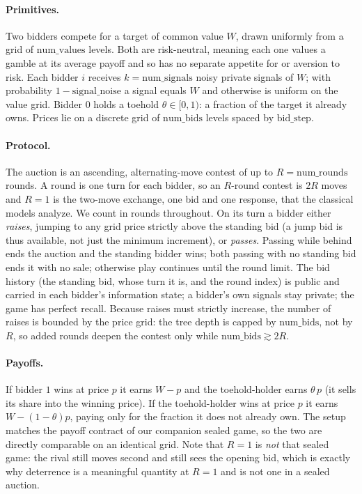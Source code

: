 \documentclass[11pt,a4paper]{article}
\newcommand{\theold}{\theta}   %
\begin{document}
\paragraph{Primitives.} Two bidders compete for a target of common value $W$, drawn uniformly from a grid of $\mathrm{num\_values}$ levels. Both are risk-neutral, meaning each one values a gamble at its average payoff and so has no separate appetite for or aversion to risk. Each bidder $i$ receives $k=\mathrm{num\_signals}$ noisy private signals of $W$; with probability $1-\mathrm{signal\_noise}$ a signal equals $W$ and otherwise is uniform on the value grid. Bidder $0$ holds a toehold $\theold\in[0,1)$: a fraction of the target it already owns. Prices lie on a discrete grid of $\mathrm{num\_bids}$ levels spaced by $\mathrm{bid\_step}$.

\paragraph{Protocol.} The auction is an ascending, alternating-move contest of up to $R=\mathrm{num\_rounds}$ rounds. A round is one turn for each bidder, so an $R$-round contest is $2R$ moves and $R=1$ is the two-move exchange, one bid and one response, that the classical models analyze. We count in rounds throughout. On its turn a bidder either \emph{raises}, jumping to any grid price strictly above the standing bid (a jump bid is thus available, not just the minimum increment), or \emph{passes}. Passing while behind ends the auction and the standing bidder wins; both passing with no standing bid ends it with no sale; otherwise play continues until the round limit. The bid history (the standing bid, whose turn it is, and the round index) is public and carried in each bidder's information state; a bidder's own signals stay private; the game has perfect recall. Because raises must strictly increase, the number of raises is bounded by the price grid: the tree depth is capped by $\mathrm{num\_bids}$, not by $R$, so added rounds deepen the contest only while $\mathrm{num\_bids}\gtrsim 2R$.

\paragraph{Payoffs.} If bidder $1$ wins at price $p$ it earns $W-p$ and the toehold-holder earns $\theold\, p$ (it sells its share into the winning price). If the toehold-holder wins at price $p$ it earns $W-(1-\theold)p$, paying only for the fraction it does not already own. The setup matches the payoff contract of our companion sealed game, so the two are directly comparable on an identical grid. Note that $R=1$ is \emph{not} that sealed game: the rival still moves second and still sees the opening bid, which is exactly why deterrence is a meaningful quantity at $R=1$ and is not one in a sealed auction.
\end{document}
